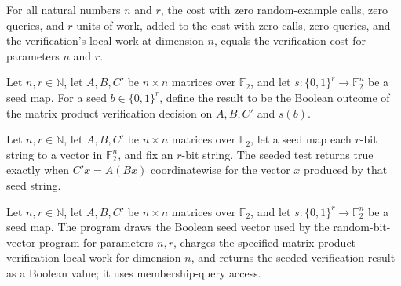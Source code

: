 \begin{theorem}
\label{FABL.matrixProductVerificationCost_eq}
\leanok
{}
For all natural numbers $n$ and $r$, the cost with zero random-example calls, zero
queries, and $r$ units of work, added to the cost with zero calls, zero queries, and the
verification's local work at dimension $n$, equals the verification cost for parameters
$n$ and $r$.
\end{theorem}

\begin{definition}
\label{FABL.seededMatrixProductVerificationResult}
\leanok
{}
Let $n,r\in\mathbb{N}$, let $A,B,C'$ be $n\times n$ matrices over $\mathbb{F}_2$, and
let $s:\{0,1\}^r\to\mathbb{F}_2^n$ be a seed map. For a seed $b\in\{0,1\}^r$, define the
result to be the Boolean outcome of the matrix product verification decision on $A,B,C'$
and $s(b)$.
\end{definition}

\begin{theorem}
\label{FABL.seededMatrixProductVerificationResult_eq_true_iff}
\leanok
{}
Let $n,r\in\mathbb{N}$, let $A,B,C'$ be $n\times n$ matrices over $\mathbb{F}_2$, let a
seed map each $r$-bit string to a vector in $\mathbb{F}_2^n$, and fix an $r$-bit string.
The seeded test returns true exactly when $C'x=A(Bx)$ coordinatewise for the vector $x$
produced by that seed string.
\end{theorem}

\begin{definition}
\label{FABL.seededMatrixProductVerificationProgram}
\leanok
{}
Let $n,r\in\mathbb{N}$, let $A,B,C'$ be $n\times n$ matrices over $\mathbb{F}_2$, and
let $s:\{0,1\}^r\to\mathbb{F}_2^n$ be a seed map. The program draws the Boolean seed
vector used by the random-bit-vector program for parameters $n,r$, charges the specified
matrix-product verification local work for dimension $n$, and returns the seeded
verification result as a Boolean value; it uses membership-query access.
\end{definition}

